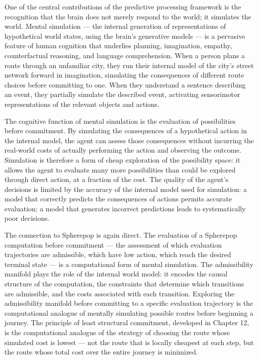 \documentclass[12pt,openany]{book}
\theoremstyle{plain}
\theoremstyle{definition}
\theoremstyle{remark}
\begin{document}
One of the central contributions of the predictive processing framework is the recognition that the brain does not merely respond to the world; it simulates the world. Mental simulation — the internal generation of representations of hypothetical world states, using the brain's generative models — is a pervasive feature of human cognition that underlies planning, imagination, empathy, counterfactual reasoning, and language comprehension. When a person plans a route through an unfamiliar city, they run their internal model of the city's street network forward in imagination, simulating the consequences of different route choices before committing to one. When they understand a sentence describing an event, they partially simulate the described event, activating sensorimotor representations of the relevant objects and actions.

The cognitive function of mental simulation is the evaluation of possibilities before commitment. By simulating the consequences of a hypothetical action in the internal model, the agent can assess those consequences without incurring the real-world costs of actually performing the action and observing the outcome. Simulation is therefore a form of cheap exploration of the possibility space: it allows the agent to evaluate many more possibilities than could be explored through direct action, at a fraction of the cost. The quality of the agent's decisions is limited by the accuracy of the internal model used for simulation: a model that correctly predicts the consequences of actions permits accurate evaluation; a model that generates incorrect predictions leads to systematically poor decisions.

The connection to Spherepop is again direct. The evaluation of a Spherepop computation before commitment — the assessment of which evaluation trajectories are admissible, which have low action, which reach the desired terminal state — is a computational form of mental simulation. The admissibility manifold plays the role of the internal world model: it encodes the causal structure of the computation, the constraints that determine which transitions are admissible, and the costs associated with each transition. Exploring the admissibility manifold before committing to a specific evaluation trajectory is the computational analogue of mentally simulating possible routes before beginning a journey. The principle of least structural commitment, developed in Chapter 12, is the computational analogue of the strategy of choosing the route whose simulated cost is lowest — not the route that is locally cheapest at each step, but the route whose total cost over the entire journey is minimized.
\end{document}
